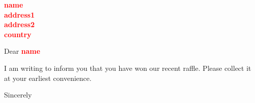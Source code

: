 \documentclass[11pt,a4paper]{letter}
\newcommand*{\VAR}[1]{\textcolor{red}{\textbf{#1}}}
\begin{document}
 
	\begin{letter}{\VAR{name}\\\VAR{address1}\\\VAR{address2}\\\VAR{country}} 
		\opening{Dear \VAR{name}} 
		
		I am writing to inform you that you have won our recent raffle.
		Please collect it at your earliest convenience.
		
		\closing{Sincerely} 
	\end{letter} 
\end{document}
